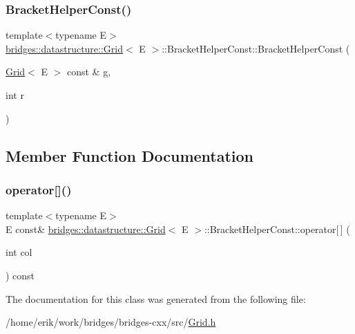 \subsubsection{\texorpdfstring{Bracket\+Helper\+Const()}{BracketHelperConst()}}
{\footnotesize\ttfamily template$<$typename E$>$ \\
\hyperlink{classbridges_1_1datastructure_1_1_grid}{bridges\+::datastructure\+::\+Grid}$<$ E $>$\+::Bracket\+Helper\+Const\+::\+Bracket\+Helper\+Const (\begin{DoxyParamCaption}\item[{\hyperlink{classbridges_1_1datastructure_1_1_grid}{Grid}$<$ E $>$ const \&}]{g,  }\item[{int}]{r }\end{DoxyParamCaption})\hspace{0.3cm}{\ttfamily [inline]}}



\subsection{Member Function Documentation}
\mbox{\label{classbridges_1_1datastructure_1_1_grid_1_1_bracket_helper_const_a3a0571d419200f98e525441e16bb707c}} 
\subsubsection{\texorpdfstring{operator[]()}{operator[]()}}
{\footnotesize\ttfamily template$<$typename E$>$ \\
E const\& \hyperlink{classbridges_1_1datastructure_1_1_grid}{bridges\+::datastructure\+::\+Grid}$<$ E $>$\+::Bracket\+Helper\+Const\+::operator\mbox{[}$\,$\mbox{]} (\begin{DoxyParamCaption}\item[{int}]{col }\end{DoxyParamCaption}) const\hspace{0.3cm}{\ttfamily [inline]}}



The documentation for this class was generated from the following file\+:\begin{DoxyCompactItemize}
\item 
/home/erik/work/bridges/bridges-\/cxx/src/\hyperlink{_grid_8h}{Grid.\+h}\end{DoxyCompactItemize}
